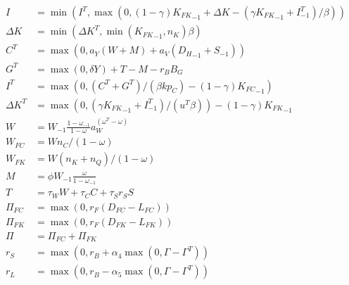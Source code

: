 \documentclass{article}
\begin{document}
\begin{align}
    I            & = \min(I^T, \max(0, (1-\gamma) {K_{FK}}_{-1} + {\Delta K} - (\gamma {K_{FK}}_{-1} + I^T_{-1}) / \beta))  \\
    \Delta K     & = \min({\Delta K}^T, \min({K_{FK}}_{-1}, n_K) \beta)                                                     \\
    C^T          & = \max(0, a_Y (W + M) + a_V ({D_H}_{-1} + S_{-1}))                                                       \\
    G^T          & = \max(0, \delta Y) + T - M - r_{B} B_G                                                                  \\
    I^T          & = \max(0, (C^T + G^T)/(\beta k p_C) - (1-\gamma){K_{FC}}_{-1})                                           \\
    {\Delta K}^T & = \max(0, (\gamma {K_{FK}}_{-1} + I^T_{-1}) / (u^T \beta)) - (1-\gamma) {K_{FK}}_{-1}                    \\
    W            & = W_{-1} \frac{1-\omega_{-1}}{1-\omega} a_W^{(\omega^T - \omega)}                                        \\
    W_{FC}       & = W n_C / (1-\omega)                                                                                     \\
    W_{FK}       & = W (n_K + n_Q) / (1-\omega)                                                                             \\
    M            & = \phi W_{-1} \frac{\omega}{1-\omega_{-1}}                                                               \\
    T            & = \tau_W W + \tau_C C + \tau_S r_S S                                                                     \\
    \Pi_{FC}     & = \max(0, r_F (D_{FC} - L_{FC}))                                                                         \\
    \Pi_{FK}     & = \max(0, r_F(D_{FK}- L_{FK}))                                                                           \\
    \Pi          & = \Pi_{FC} + \Pi_{FK}                                                                                    \\
    r_S          & = \max(0, r_B + \alpha_4 \max(0, \Gamma-\Gamma^T))                                                       \\
    r_L          & = \max(0, r_B - \alpha_5 \max(0, \Gamma-\Gamma^T))                                                       \\

\end{align}
\end{document}
